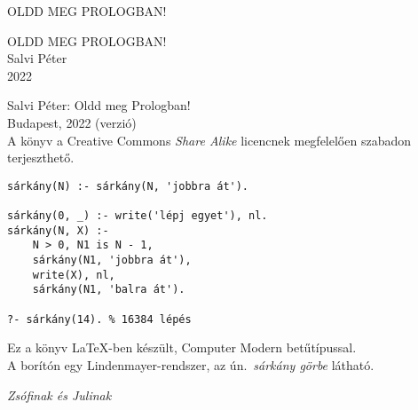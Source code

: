 \documentclass[a5paper]{book}
\theoremstyle{definition}
\begin{document}
\frontmatter
{}



\thispagestyle{empty}
\newpage

\begin{titlepage}
\thispagestyle{empty}
\centering
\vspace*{2cm}
{\large OLDD MEG PROLOGBAN!}
\end{titlepage}

\thispagestyle{empty}
\newpage

\begin{titlepage}
\centering
\vspace*{2cm}
{\Large OLDD MEG PROLOGBAN!}\\
\vspace{8cm}
{\large Salvi Péter}\\
\vspace{1em}
2022
\end{titlepage}

\thispagestyle{empty}
\begin{center}
  \small
  Salvi Péter: Oldd meg Prologban!\\
  Budapest, 2022 (verzió)\\
  \bigskip
  A könyv a Creative Commons \emph{Share Alike} licencnek megfelelően
  szabadon terjeszthető.
\end{center}
\vfill
\begin{center}
\begin{BVerbatim}
sárkány(N) :- sárkány(N, 'jobbra át').

sárkány(0, _) :- write('lépj egyet'), nl.
sárkány(N, X) :-
    N > 0, N1 is N - 1,
    sárkány(N1, 'jobbra át'),
    write(X), nl,
    sárkány(N1, 'balra át').

?- sárkány(14). %
\end{BVerbatim}
\end{center}
\vfill
{\footnotesize Ez a könyv \LaTeX-ben készült, Computer Modern betűtípussal.\\
  A borítón egy Lindenmayer-rendszer, az ún.~\emph{sárkány görbe} látható.
}

\clearpage
\thispagestyle{empty}
\begin{center}
  \vspace*{\fill}
  {\Large\emph{Zsófinak és Julinak}}
  \vspace*{\fill}
\end{center}
\clearpage

\thispagestyle{empty}
\newpage

\addtocounter{page}{2}

\tableofcontents



\mainmatter
{}









\backmatter





\printindex
\end{document}
